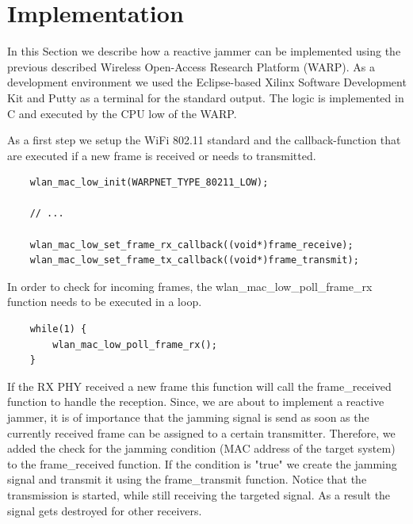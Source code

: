 \documentclass[sigconf]{acmart}
\begin{document}
\section{Implementation}

In this Section we describe how a reactive jammer can be implemented using the previous described
Wireless Open-Access Research Platform (WARP). As a development environment we used the Eclipse-based
Xilinx Software Development Kit and Putty as a terminal for the standard output. The logic is
implemented in C and executed by the CPU low of the WARP.

\pagebreak

As a first step we setup the WiFi 802.11 standard and the callback-function that are executed if a
new frame is received or needs to transmitted. 

\begin{verbatim}
	wlan_mac_low_init(WARPNET_TYPE_80211_LOW);

	// ...

	wlan_mac_low_set_frame_rx_callback((void*)frame_receive);
	wlan_mac_low_set_frame_tx_callback((void*)frame_transmit);
\end{verbatim}

In order to check for incoming frames, the wlan\_mac\_low\_poll\_frame\_rx function needs to be executed
in a loop. 

\begin{verbatim}
	while(1) {
		wlan_mac_low_poll_frame_rx();
	}
\end{verbatim}

If the RX PHY received a new frame this function will call the frame\_received function to handle the
reception. Since, we are about to implement a reactive jammer, it is of importance that the jamming
signal is send as soon as the currently received frame can be assigned to a certain transmitter.
Therefore, we added the check for the jamming condition (MAC address of the target system) to the
frame\_received function. If the condition is "true" we create the jamming signal and transmit it
using the frame\_transmit function. Notice that the transmission is started, while still
receiving the targeted signal. As a result the signal gets destroyed for other receivers.
\end{document}
